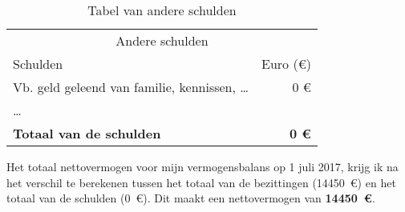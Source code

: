 \begin{table}[!htbp]
	\centering
	\begin{tabular}{@{}lr@{}}
		\toprule
		                \multicolumn{2}{c}{Andere schulden}                 \\
		\cmidrule(r){1-2}
		Schulden                   &     Euro (\euro{}) \\ \midrule
		Vb. geld geleend van familie, kennissen, \dots &          0 \euro{} \\
		\dots                                          &  \\ \toprule
		\textbf{Totaal van de schulden}                & \textbf{0 \euro{}} \\ \bottomrule
	\end{tabular}
	\caption{Tabel van andere schulden}
	\label{tab:tabelandereschulden}
\end{table}
Het totaal nettovermogen voor mijn vermogensbalans op 1 juli 2017, krijg ik na het verschil te berekenen tussen het totaal van de bezittingen (14450~\euro{}) en het totaal van de schulden (0~\euro{}). Dit maakt een nettovermogen van \textbf{14450~\euro{}}.

